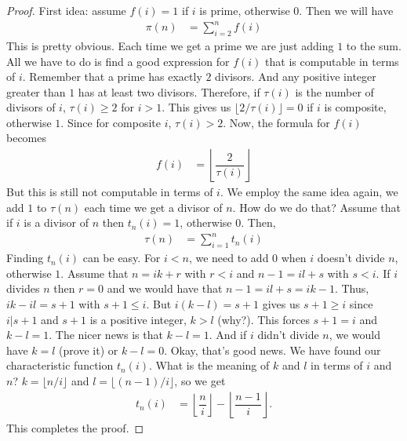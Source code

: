 \documentclass{subfiles}
\begin{document}
	\begin{proof}
		First idea: assume $f(i)=1$ if $i$ is prime, otherwise $0$. Then we will have
		\begin{align*}
			\pi(n) & = \sum_{i=2}^{n}f(i)
		\end{align*}
		This is pretty obvious. Each time we get a prime we are just adding $1$ to the sum. All we have to do is find a good expression for $f(i)$ that is computable in terms of $i$. Remember that  a prime has exactly $2$ divisors. And any positive integer greater than $1$ has at least two divisors. Therefore, if $\tau(i)$ is the number of divisors of $i$, $\tau(i)\geq2$ for $i>1$. This gives us $\lfloor 2/\tau(i)\rfloor=0$ if $i$ is composite, otherwise $1$. Since for composite $i$, $\tau(i)>2$. Now, the formula for $f(i)$ becomes
		\begin{align*}
			f(i) & = \left\lfloor\dfrac{2}{\tau(i)}\right\rfloor
		\end{align*}
		But this is still not computable in terms of $i$. We employ the same idea again, we add $1$ to $\tau(n)$ each time we get a divisor of $n$. How do we do that? Assume that if $i$ is a divisor of $n$ then $t_n(i)=1$, otherwise $0$. Then,
		\begin{align*}
			\tau(n) & = \sum_{i=1}^{n}t_n(i)
		\end{align*}
		Finding $t_n(i)$ can be easy. For $i<n$, we need to add $0$ when $i$ doesn't divide $n$, otherwise $1$. Assume that $n=ik+r$ with $r<i$ and $n-1=il+s$ with $s<i$. If $i$ divides $n$ then $r=0$ and we would have that $n-1=il+s=ik-1$. Thus, $ik-il=s+1$ with $s+1\leq i$. But $i(k-l)=s+1$ gives us $s+1\geq i$ since $i|s+1$ and $s+1$ is a positive integer, $k>l$ (why?). This forces $s+1=i$ and $k-l=1$. The nicer news is that $k-l=1$. And if $i$ didn't divide $n$, we would have $k=l$ (prove it) or $k-l=0$. Okay, that's good news. We have found our characteristic function $t_n(i)$. What is the meaning of $k$ and $l$ in terms of $i$ and $n$? $k=\lfloor n/i\rfloor$ and $l=\lfloor (n-1)/i\rfloor$, so we get
		\begin{align*}
			t_n(i) & = \left\lfloor\dfrac{n}{i}\right\rfloor-\left\lfloor\dfrac{n-1}{i}\right\rfloor.
		\end{align*}
		This completes the proof.
	\end{proof}
\end{document}
